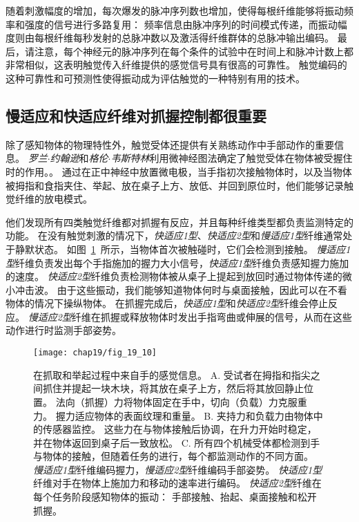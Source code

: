 随着刺激幅度的增加，每次爆发的脉冲序列数也增加，使得每根纤维能够将振动频率和强度的信号进行多路复用：
频率信息由脉冲序列的时间模式传递，而振动幅度则由每根纤维每秒发射的总脉冲数以及激活得纤维群体的总脉冲输出编码。
最后，请注意，每个神经元的脉冲序列在每个条件的试验中在时间上和脉冲计数上都非常相似，这表明触觉传入纤维提供的感觉信号具有很高的可靠性。 
触觉编码的这种可靠性和可预测性使得振动成为评估触觉的一种特别有用的技术。



\subsection{慢适应和快适应纤维对抓握控制都很重要}

除了感知物体的物理特性外，触觉受体还提供有关熟练动作中手部动作的重要信息。
\textit{罗兰$\cdot$约翰逊}和\textit{格伦$\cdot$韦斯特林}利用微神经图法确定了触觉受体在物体被受握住时的作用。。
通过在正中神经中放置微电极，当手指初次接触物体时，以及当物体被拇指和食指夹住、举起、放在桌子上方、放低、并回到原位时，他们能够记录触觉纤维的放电模式。


他们发现所有四类触觉纤维都对抓握有反应，并且每种纤维类型都负责监测特定的功能。
在没有触觉刺激的情况下，\textit{快适应1型}、\textit{快适应2型}和\textit{慢适应1型}纤维通常处于静默状态。
如图~\ref{fig:19_10}~所示，当物体首次被触碰时，它们会检测到接触。
\textit{慢适应1型}纤维负责发出每个手指施加的握力大小信号，\textit{快适应1型}纤维负责感知握力施加的速度。
\textit{快适应2型}纤维负责检测物体被从桌子上提起到放回时通过物体传递的微小冲击波。
由于这些振动，我们能够知道物体何时与桌面接触，因此可以在不看物体的情况下操纵物体。
在抓握完成后，\textit{快适应1型}和\textit{快适应2型}纤维会停止反应。
\textit{慢适应2型}纤维在抓握或释放物体时发出手指弯曲或伸展的信号，从而在这些动作进行时监测手部姿势。


\begin{figure}[htbp]
	\centering
	\texttt{[image: chap19/fig\_19\_10]}
	\caption{在抓取和举起过程中来自手的感觉信息\cite{johansson1996sensory}。
		A. 受试者在拇指和指尖之间抓住并提起一块木块，将其放在桌子上方，然后将其放回静止位置。
		法向（抓握）力将物体固定在手中，切向（负载）力克服重力。
		握力适应物体的表面纹理和重量。
		B. 夹持力和负载力由物体中的传感器监控。
		这些力在与物体接触后协调，在升力开始时稳定，并在物体返回到桌子后一致放松。
		C. 所有四个机械受体都检测到手与物体的接触，但随着任务的进行，每个都监测动作的不同方面。
		\textit{慢适应1型}纤维编码握力，\textit{慢适应2型}纤维编码手部姿势。
		\textit{快适应1型}纤维对手在物体上施加力和移动的速率进行编码。
		\textit{快适应2型}纤维在每个任务阶段感知物体的振动：
		手部接触、抬起、桌面接触和松开抓握。}
	\label{fig:19_10}
\end{figure}



